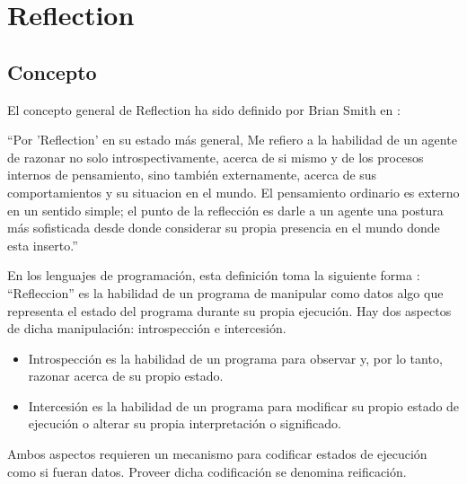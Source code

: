 \section{Reflection}

\subsection{Concepto}

El concepto general de Reflection ha sido definido por Brian Smith en
\cite{Smith84}:

``Por 'Reflection' en su estado más general, Me refiero a la habilidad de un
agente de razonar no solo introspectivamente, acerca de si mismo y de los
procesos internos de pensamiento, sino también externamente, acerca de sus
comportamientos y su situacion en el mundo. El pensamiento ordinario es externo
en un sentido simple; el punto de la reflección es darle a un agente una postura
más sofisticada desde donde considerar su propia presencia en el mundo donde
esta inserto.''

En los lenguajes de programación, esta definición toma la siguiente forma
\cite{BGW93}:
``Refleccion'' es la habilidad de un programa de manipular como datos algo que
representa el estado del programa durante su propia ejecución. Hay dos aspectos
de dicha manipulación: introspección e intercesión.
\begin{itemize}
  \item Introspección es la habilidad de un programa para observar y, por lo
tanto, razonar acerca de su propio estado.
  \item Intercesión es la habilidad de un programa para modificar su propio
  estado de ejecución o alterar su propia interpretación o significado.
\end{itemize}

Ambos aspectos requieren un mecanismo para codificar estados de ejecución como
si fueran datos. Proveer dicha codificación se denomina reificación.
